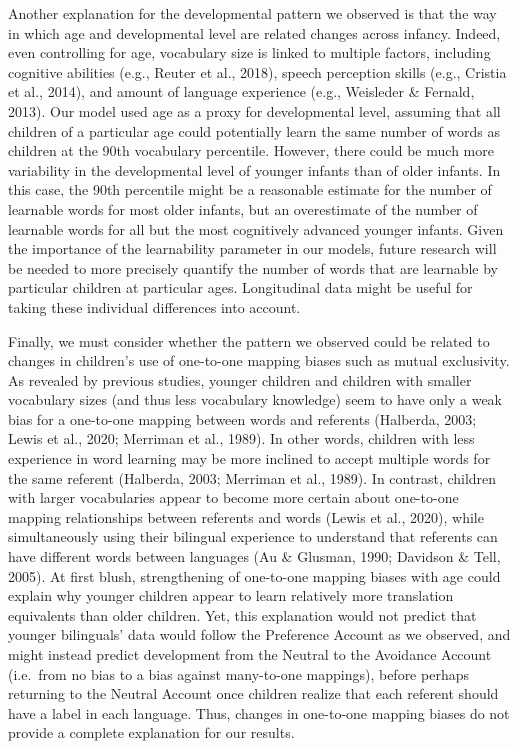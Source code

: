 \documentclass[
  english,
  ,man,floatsintext]{apa6}
\begin{document}
Another explanation for the developmental pattern we observed is that the way in which age and developmental level are related changes across infancy. Indeed, even controlling for age, vocabulary size is linked to multiple factors, including cognitive abilities (e.g., Reuter et al., 2018), speech perception skills (e.g., Cristia et al., 2014), and amount of language experience (e.g., Weisleder \& Fernald, 2013). Our model used age as a proxy for developmental level, assuming that all children of a particular age could potentially learn the same number of words as children at the 90th vocabulary percentile. However, there could be much more variability in the developmental level of younger infants than of older infants. In this case, the 90th percentile might be a reasonable estimate for the number of learnable words for most older infants, but an overestimate of the number of learnable words for all but the most cognitively advanced younger infants. Given the importance of the learnability parameter in our models, future research will be needed to more precisely quantify the number of words that are learnable by particular children at particular ages. Longitudinal data might be useful for taking these individual differences into account.

Finally, we must consider whether the pattern we observed could be related to changes in children's use of one-to-one mapping biases such as mutual exclusivity. As revealed by previous studies, younger children and children with smaller vocabulary sizes (and thus less vocabulary knowledge) seem to have only a weak bias for a one-to-one mapping between words and referents (Halberda, 2003; Lewis et al., 2020; Merriman et al., 1989). In other words, children with less experience in word learning may be more inclined to accept multiple words for the same referent (Halberda, 2003; Merriman et al., 1989). In contrast, children with larger vocabularies appear to become more certain about one-to-one mapping relationships between referents and words (Lewis et al., 2020), while simultaneously using their bilingual experience to understand that referents can have different words between languages (Au \& Glusman, 1990; Davidson \& Tell, 2005). At first blush, strengthening of one-to-one mapping biases with age could explain why younger children appear to learn relatively more translation equivalents than older children. Yet, this explanation would not predict that younger bilinguals' data would follow the Preference Account as we observed, and might instead predict development from the Neutral to the Avoidance Account (i.e.~from no bias to a bias against many-to-one mappings), before perhaps returning to the Neutral Account once children realize that each referent should have a label in each language. Thus, changes in one-to-one mapping biases do not provide a complete explanation for our results.
\end{document}
